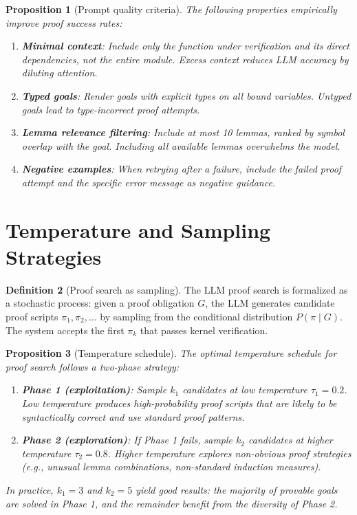 \documentclass[11pt,a4paper]{report}
\theoremstyle{definition}
\newtheorem{definition}{Definition}[chapter]
\theoremstyle{plain}
\newtheorem{proposition}[definition]{Proposition}
\begin{document}
\begin{proposition}[Prompt quality criteria]
The following properties empirically improve proof success rates:
\begin{enumerate}
  \item \textbf{Minimal context}: Include only the function under verification
    and its direct dependencies, not the entire module.  Excess context reduces
    LLM accuracy by diluting attention.
  \item \textbf{Typed goals}: Render goals with explicit types on all bound
    variables.  Untyped goals lead to type-incorrect proof attempts.
  \item \textbf{Lemma relevance filtering}: Include at most 10 lemmas, ranked
    by symbol overlap with the goal.  Including all available lemmas overwhelms
    the model.
  \item \textbf{Negative examples}: When retrying after a failure, include the
    failed proof attempt and the specific error message as negative guidance.
\end{enumerate}
\end{proposition}


\section{Temperature and Sampling Strategies}

\begin{definition}[Proof search as sampling]
\label{def:proof-sampling}
The LLM proof search is formalized as a stochastic process: given a proof
obligation $G$, the LLM generates candidate proof scripts
$\pi_1, \pi_2, \ldots$ by sampling from the conditional distribution
$P(\pi \mid G)$.  The system accepts the first $\pi_k$ that passes kernel
verification.
\end{definition}

\begin{proposition}[Temperature schedule]
\label{prop:temperature}
The optimal temperature schedule for proof search follows a two-phase strategy:
\begin{enumerate}
  \item \textbf{Phase 1 (exploitation)}: Sample $k_1$ candidates at low
    temperature $\tau_1 = 0.2$.  Low temperature produces high-probability
    proof scripts that are likely to be syntactically correct and use standard
    proof patterns.
  \item \textbf{Phase 2 (exploration)}: If Phase 1 fails, sample $k_2$
    candidates at higher temperature $\tau_2 = 0.8$.  Higher temperature
    explores non-obvious proof strategies (e.g., unusual lemma combinations,
    non-standard induction measures).
\end{enumerate}
In practice, $k_1 = 3$ and $k_2 = 5$ yield good results: the majority of
provable goals are solved in Phase 1, and the remainder benefit from the
diversity of Phase 2.
\end{proposition}
\end{document}
